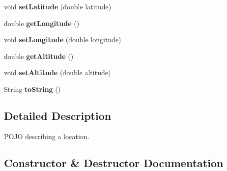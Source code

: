 \begin{DoxyCompactItemize}
\item 
void {\bfseries set\+Latitude} (double latitude)\hypertarget{classeu_1_1h2020_1_1symbiote_1_1model_1_1Location_a26b8aab258d4422bd5fc64d7a512b685}{}\label{classeu_1_1h2020_1_1symbiote_1_1model_1_1Location_a26b8aab258d4422bd5fc64d7a512b685}

\item 
double {\bfseries get\+Longitude} ()\hypertarget{classeu_1_1h2020_1_1symbiote_1_1model_1_1Location_afe9ac4993b9dbcc9350e2667e279d39b}{}\label{classeu_1_1h2020_1_1symbiote_1_1model_1_1Location_afe9ac4993b9dbcc9350e2667e279d39b}

\item 
void {\bfseries set\+Longitude} (double longitude)\hypertarget{classeu_1_1h2020_1_1symbiote_1_1model_1_1Location_a6bc9a04947915ea52001bccbcba0849e}{}\label{classeu_1_1h2020_1_1symbiote_1_1model_1_1Location_a6bc9a04947915ea52001bccbcba0849e}

\item 
double {\bfseries get\+Altitude} ()\hypertarget{classeu_1_1h2020_1_1symbiote_1_1model_1_1Location_a333c37abcd3c9ea766ca5ec6dddd5e3a}{}\label{classeu_1_1h2020_1_1symbiote_1_1model_1_1Location_a333c37abcd3c9ea766ca5ec6dddd5e3a}

\item 
void {\bfseries set\+Altitude} (double altitude)\hypertarget{classeu_1_1h2020_1_1symbiote_1_1model_1_1Location_ac2fc6d59229ad7253416f2fdf650675d}{}\label{classeu_1_1h2020_1_1symbiote_1_1model_1_1Location_ac2fc6d59229ad7253416f2fdf650675d}

\item 
String {\bfseries to\+String} ()\hypertarget{classeu_1_1h2020_1_1symbiote_1_1model_1_1Location_a5c3569ceefaa1d39a44d09fe8269abe6}{}\label{classeu_1_1h2020_1_1symbiote_1_1model_1_1Location_a5c3569ceefaa1d39a44d09fe8269abe6}

\end{DoxyCompactItemize}


\subsection{Detailed Description}
P\+O\+JO describing a location. 

\subsection{Constructor \& Destructor Documentation}

